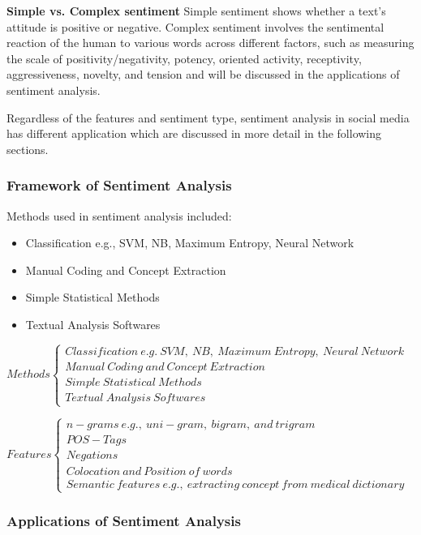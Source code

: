 \documentclass[11pt,a4paper]{article}
\begin{document}
\textbf{Simple vs. Complex sentiment } Simple sentiment shows whether a text's attitude is positive or negative. Complex sentiment involves the sentimental reaction of the human to various words across different factors, such as measuring the scale of positivity/negativity, potency, oriented activity, receptivity, aggressiveness, novelty, and tension and will be discussed in the applications of sentiment analysis.

Regardless of the features and sentiment type, sentiment analysis in social media has different application which are discussed in more detail in the following sections. 

\subsubsection{Framework of Sentiment Analysis}

Methods used in sentiment analysis included:

\begin{itemize}
\item Classification e.g., SVM, NB, Maximum Entropy, Neural Network
\item Manual Coding and Concept Extraction
\item Simple Statistical Methods
\item Textual Analysis Softwares
\end{itemize}

$
Methods\left\{\begin{matrix}
Classification\ e.g.\ SVM,\ NB,\ Maximum\ Entropy,\ Neural\ Network\\ 
Manual\ Coding\ and\ Concept\ Extraction\\ 
Simple\ Statistical\ Methods\\ 
Textual\ Analysis\ Softwares
\end{matrix}\right.
$

$
Features\left\{\begin{matrix}
n-grams\ e.g.,\ uni-gram,\ bigram,\ and\ trigram\\ 
POS-Tags\\ 
Negations\\ 
Colocation\ and\ Position\ of\ words\\
Semantic\ features\ e.g.,\ extracting\ concept\ from\ medical\ dictionary
\end{matrix}\right.
$
\subsubsection{Applications of Sentiment Analysis}
\end{document}
